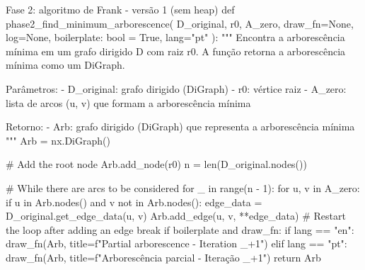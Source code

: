 \documentclass[12pt,a4paper]{article}
\begin{document}
\begin{pybox}{Fase 2: algoritmo de Frank - versão 1 (sem heap)}
def phase2_find_minimum_arborescence(
    D_original, r0, A_zero, draw_fn=None, log=None, boilerplate: bool = True, lang="pt"
):
    """
    Encontra a arborescência mínima em um grafo dirigido D com raiz r0.
    A função retorna a arborescência mínima como um DiGraph.

    Parâmetros:
        - D_original: grafo dirigido (DiGraph)
        - r0: vértice raiz
        - A_zero: lista de arcos (u, v) que formam a arborescência mínima

    Retorno:
        - Arb: grafo dirigido (DiGraph) que representa a arborescência mínima
    """
    Arb = nx.DiGraph()

    # Add the root node
    Arb.add_node(r0)
    n = len(D_original.nodes())

    # While there are arcs to be considered
    for _ in range(n - 1):
        for u, v in A_zero:
            if u in Arb.nodes() and v not in Arb.nodes():
                edge_data = D_original.get_edge_data(u, v)
                Arb.add_edge(u, v, **edge_data)
                # Restart the loop after adding an edge
                break
        if boilerplate and draw_fn:
            if lang == "en":
                draw_fn(Arb, title=f"Partial arborescence - Iteration {_+1}")
            elif lang == "pt":
                draw_fn(Arb, title=f"Arborescência parcial - Iteração {_+1}")
    return Arb
\end{pybox}
\end{document}
